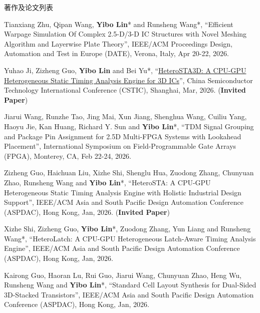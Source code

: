 \begin{rSection}{著作及论文列表}
\begin{description}[font=\normalfont, rightmargin=2em]
{}
            

\item[{[C213]}]{
        Tianxiang Zhu, Qipan Wang, \textbf{Yibo Lin}* and Runsheng Wang*, 
    ``Efficient Warpage Simulation Of Complex 2.5-D/3-D IC Structures with Novel Meshing Algorithm and Layerwise Plate Theory'', 
    IEEE/ACM Proceedings Design, Automation and Test in Europe (DATE), Verona, Italy, Apr 20-22, 2026.
    
}
            

\item[{[C212]}]{
        Yuhao Ji, Zizheng Guo, \textbf{Yibo Lin} and Bei Yu*, 
    ``\href{https://doi.org/10.1109/CSTIC68613.2026.11537849}{HeteroSTA3D: A CPU-GPU Heterogeneous Static Timing Analysis Engine for 3D ICs}'', 
    China Semiconductor Technology International Conference (CSTIC), Shanghai, Mar, 2026.
    (\textbf{Invited Paper})
}
            

\item[{[C211]}]{
        Jiarui Wang, Runzhe Tao, Jing Mai, Xun Jiang, Shenghua Wang, Cuiliu Yang, Haoyu Jie, Kan Huang, Richard Y. Sun and \textbf{Yibo Lin}*, 
    ``TDM Signal Grouping and Package Pin Assignment for 2.5D Multi-FPGA Systems with Lookahead Placement'', 
    International Symposium on Field-Programmable Gate Arrays (FPGA), Monterey, CA, Feb 22-24, 2026.
    
}
            

\item[{[C210]}]{
        Zizheng Guo, Haichuan Liu, Xizhe Shi, Shenglu Hua, Zuodong Zhang, Chunyuan Zhao, Runsheng Wang and \textbf{Yibo Lin}*, 
    ``HeteroSTA: A CPU-GPU Heterogeneous Static Timing Analysis Engine with Holistic Industrial Design Support'', 
    IEEE/ACM Asia and South Pacific Design Automation Conference (ASPDAC), Hong Kong, Jan, 2026.
    (\textbf{Invited Paper})
}
            

\item[{[C209]}]{
        Xizhe Shi, Zizheng Guo, \textbf{Yibo Lin}*, Zuodong Zhang, Yun Liang and Runsheng Wang*, 
    ``HeteroLatch: A CPU-GPU Heterogeneous Latch-Aware Timing Analysis Engine'', 
    IEEE/ACM Asia and South Pacific Design Automation Conference (ASPDAC), Hong Kong, Jan, 2026.
    
}
            

\item[{[C208]}]{
        Kairong Guo, Haoran Lu, Rui Guo, Jiarui Wang, Chunyuan Zhao, Heng Wu, Runsheng Wang and \textbf{Yibo Lin}*, 
    ``Standard Cell Layout Synthesis for Dual-Sided 3D-Stacked Transistors'', 
    IEEE/ACM Asia and South Pacific Design Automation Conference (ASPDAC), Hong Kong, Jan, 2026.
    
}
\end{description}
\end{rSection}
